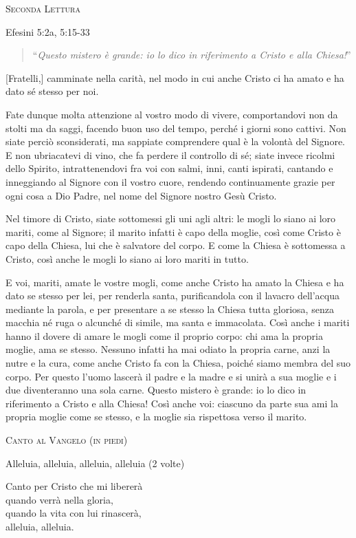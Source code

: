 \documentclass[12pt,twoside]{article}
\newcommand{\masssubpart}[1]{\bigskip

  {\large\scshape #1}}
\newcommand{\reading}[1]{#1}
\newcommand{\readingquote}[1]{
\begin{quote}
``\textit{#1}''
\end{quote}
}
\begin{document}
{\masssubpart{Seconda Lettura}

\reading{Efesini 5:2a, 5:15-33}
\readingquote{Questo mistero è grande: io lo dico in riferimento a Cristo e alla Chiesa!}

[Fratelli,] camminate nella carità, nel modo in cui anche Cristo ci ha amato e ha dato sé stesso per noi.

Fate dunque molta attenzione al vostro modo di vivere, comportandovi non da stolti ma da saggi, facendo buon uso del tempo, perché i giorni sono cattivi. Non siate perciò sconsiderati, ma sappiate comprendere qual è la volontà del Signore. E non ubriacatevi di vino, che fa perdere il controllo di sé; siate invece ricolmi dello Spirito, intrattenendovi fra voi con salmi, inni, canti ispirati, cantando e inneggiando al Signore con il vostro cuore, rendendo continuamente grazie per ogni cosa a Dio Padre, nel nome del Signore nostro Gesù Cristo.

Nel timore di Cristo, siate sottomessi gli uni agli altri: le mogli lo siano ai loro mariti, come al Signore; il marito infatti è capo della moglie, così come Cristo è capo della Chiesa, lui che è salvatore del corpo. E come la Chiesa è sottomessa a Cristo, così anche le mogli lo siano ai loro mariti in tutto.

E voi, mariti, amate le vostre mogli, come anche Cristo ha amato la Chiesa e ha dato se stesso per lei, per renderla santa, purificandola con il lavacro dell'acqua mediante la parola, e per presentare a se stesso la Chiesa tutta gloriosa, senza macchia né ruga o alcunché di simile, ma santa e immacolata. Così anche i mariti hanno il dovere di amare le mogli come il proprio corpo: chi ama la propria moglie, ama se stesso. Nessuno infatti ha mai odiato la propria carne, anzi la nutre e la cura, come anche Cristo fa con la Chiesa, poiché siamo membra del suo corpo. Per questo l'uomo lascerà il padre e la madre e si unirà a sua moglie e i due diventeranno una sola carne. Questo mistero è grande: io lo dico in riferimento a Cristo e alla Chiesa! Così anche voi: ciascuno da parte sua ami la propria moglie come se stesso, e la moglie sia rispettosa verso il marito.

\masssubpart{Canto al Vangelo (in piedi)}

Alleluia, alleluia, alleluia, alleluia (2 volte)

Canto per Cristo che mi libererà\\
quando verrà nella gloria,\\
quando la vita con lui rinascerà,\\
alleluia, alleluia.

}
\end{document}

